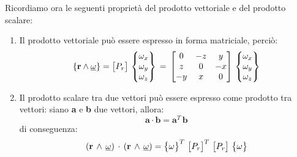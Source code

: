 Ricordiamo ora le seguenti proprietà del prodotto vettoriale e del prodotto scalare:
\begin{enumerate}
\item Il prodotto vettoriale può essere espresso in forma matriciale, perciò:
\[ \{\mathbf{r}\wedge\underline{\omega}\} = \begin{bmatrix}P_r\end{bmatrix}\,\begin{Bmatrix}\omega_x\\\omega_y\\\omega_z\end{Bmatrix}\,=\,\begin{bmatrix}0&-z&y\\z&0&-x\\-y&x&0\end{bmatrix}\,\begin{Bmatrix}\omega_x\\\omega_y\\\omega_z  \end{Bmatrix}\]
\item Il prodotto scalare tra due vettori può essere espresso come prodotto tra vettori: siano \textbf{a} e \textbf{b} due vettori, allora:
\[\mathbf{a}\cdot \mathbf{b} = \mathbf{a}^T \,\mathbf{b}\]
di conseguenza:
\[(\mathbf{r}\,\wedge\,\underline{\omega})\,\cdot\,(\mathbf{r}\,\wedge\,\underline{\omega}) = \begin{Bmatrix}\omega\end{Bmatrix}^T\,\begin{bmatrix}P_r\end{bmatrix}^T\,\begin{bmatrix}P_r\end{bmatrix}\,\begin{Bmatrix}\omega\end{Bmatrix}\]
\end{enumerate}

